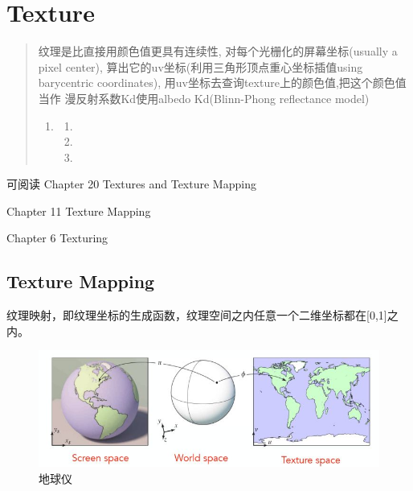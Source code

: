 \chapter{Texture}

\begin{abstract}
    纹理是比直接用颜色值更具有连续性, 对每个光栅化的屏幕坐标(usually a pixel center), 
    算出它的uv坐标(利用三角形顶点重心坐标插值using barycentric coordinates), 
    用uv坐标去查询texture上的颜色值,把这个颜色值当作
    漫反射系数Kd使用albedo Kd(Blinn-Phong reflectance model)
    \begin{enumerate}
        \item {}
        \begin{enumerate}
            \item {}
            \item {}
            \item {}
        \end{enumerate}
    \end{enumerate}    
\end{abstract}

可阅读
Chapter 20 Textures and Texture Mapping\cite{CGPP3ed}

Chapter 11 Texture Mapping\cite{FCG4ed}

Chapter 6 Texturing\cite{RTR4ed}

\section{Texture Mapping}
纹理映射，即纹理坐标的生成函数，纹理空间之内任意一个二维坐标都在[0,1]之内。

\begin{figure}[h]
    \centering
    \includegraphics[width=1\textwidth]{images/texture-mapping-sphere.jpg}
    \caption{地球仪}    
\end{figure}

